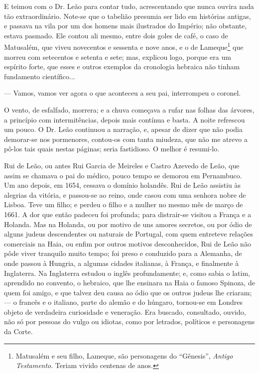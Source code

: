 E teimou com o Dr. Leão para contar tudo, acrescentando que nunca ouvira
nada tão extraordinário. Note-se que o tabelião presumia ser lido em
histórias antigas, e passava na vila por um dos homens mais ilustrados
do Império; não obstante, estava pasmado. Ele contou ali mesmo, entre
dois goles de café, o caso de Matusalém, que viveu novecentos e sessenta
e nove anos, e o de Lameque\footnote{Matusalém e seu filho, Lameque, são
  personagens do ``Gênesis'', \emph{Antigo Testamento}. Teriam vivido
  centenas de anos.} que morreu com setecentos e setenta e sete; mas,
explicou logo, porque era um espírito forte, que esses e outros exemplos
da cronologia hebraica não tinham fundamento científico...

--- Vamos, vamos ver agora o que aconteceu a seu pai, interrompeu o
coronel.

O vento, de esfalfado, morrera; e a chuva começava a rufar nas folhas
das árvores, a princípio com intermitências, depois mais contínua e
basta. A noite refrescou um pouco. O Dr. Leão continuou a narração, e,
apesar de dizer que não podia demorar-se nos pormenores, contou-os com
tanta miudeza, que não me atrevo a pô-los tais quais nestas páginas;
seria fastidioso. O melhor é resumi-lo.

Rui de Leão, ou antes Rui Garcia de Meireles e Castro Azevedo de Leão,
que assim se chamava o pai do médico, pouco tempo se demorou em
Pernambuco. Um ano depois, em 1654, cessava o domínio holandês. Rui de
Leão assistiu às alegrias da vitória, e passou-se ao reino, onde casou
com uma senhora nobre de Lisboa. Teve um filho; e perdeu o filho e a
mulher no mesmo mês de março de 1661. A dor que então padeceu foi
profunda; para distrair-se visitou a França e a Holanda. Mas na Holanda,
ou por motivo de uns amores secretos, ou por ódio de alguns judeus
descendentes ou naturais de Portugal, com quem entreteve relações
comerciais na Haia, ou enfim por outros motivos desconhecidos, Rui de
Leão não pôde viver tranquilo muito tempo; foi preso e conduzido para a
Alemanha, de onde passou à Hungria, a algumas cidades italianas, à
França, e finalmente à Inglaterra. Na Inglaterra estudou o inglês
profundamente; e, como sabia o latim, aprendido no convento, o hebraico,
que lhe ensinara na Haia o famoso Spinoza, de quem foi amigo, e que
talvez deu causa ao ódio que os outros judeus lhe criaram; --- o francês
e o italiano, parte do alemão e do húngaro, tornou-se em Londres objeto
de verdadeira curiosidade e veneração. Era buscado, consultado, ouvido,
não só por pessoas do vulgo ou idiotas, como por letrados, políticos e
personagens da Corte.

